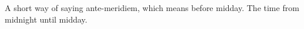 A short way of saying ante-meridiem, which means before midday.  
The time from midnight until midday.